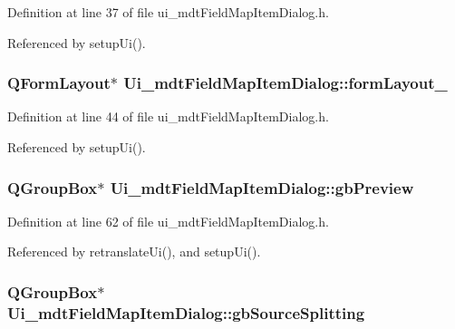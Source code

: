 Definition at line 37 of file ui\-\_\-mdt\-Field\-Map\-Item\-Dialog.\-h.



Referenced by setup\-Ui().

\hypertarget{class_ui__mdt_field_map_item_dialog_ae88b9938c970171ff5bb0a6b76e5439a}{
\subsubsection[{form\-Layout\-\_\-4}]{\setlength{\rightskip}{0pt plus 5cm}Q\-Form\-Layout$\ast$ Ui\-\_\-mdt\-Field\-Map\-Item\-Dialog\-::form\-Layout\-\_}}\label{class_ui__mdt_field_map_item_dialog_ae88b9938c970171ff5bb0a6b76e5439a}


Definition at line 44 of file ui\-\_\-mdt\-Field\-Map\-Item\-Dialog.\-h.



Referenced by setup\-Ui().

\hypertarget{class_ui__mdt_field_map_item_dialog_a1af87d49353d444fd572b41865952f2b}{
\subsubsection[{gb\-Preview}]{\setlength{\rightskip}{0pt plus 5cm}Q\-Group\-Box$\ast$ Ui\-\_\-mdt\-Field\-Map\-Item\-Dialog\-::gb\-Preview}}\label{class_ui__mdt_field_map_item_dialog_a1af87d49353d444fd572b41865952f2b}


Definition at line 62 of file ui\-\_\-mdt\-Field\-Map\-Item\-Dialog.\-h.



Referenced by retranslate\-Ui(), and setup\-Ui().

\hypertarget{class_ui__mdt_field_map_item_dialog_a060e5226c2b396395607a633b7a43f14}{
\subsubsection[{gb\-Source\-Splitting}]{\setlength{\rightskip}{0pt plus 5cm}Q\-Group\-Box$\ast$ Ui\-\_\-mdt\-Field\-Map\-Item\-Dialog\-::gb\-Source\-Splitting}}\label{class_ui__mdt_field_map_item_dialog_a060e5226c2b396395607a633b7a43f14}


